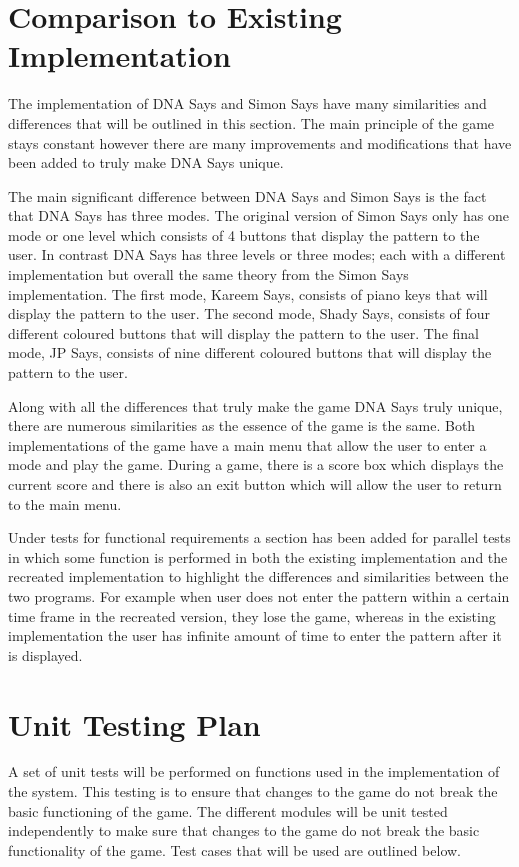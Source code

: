 \documentclass[12pt, titlepage]{article}
\begin{document}
\section{Comparison to Existing Implementation}	
\par The implementation of DNA Says and Simon Says have many similarities and differences that will be outlined in this section. The main principle of the game stays constant however there are many improvements and modifications that have been added to truly make DNA Says unique. 
\\
\par The main significant difference between DNA Says and Simon Says is the fact that DNA Says has three modes. The original version of Simon Says only has one mode or one level which consists of 4 buttons that display the pattern to the user. In contrast DNA Says has three levels or three modes; each with a different implementation but overall the same theory from the Simon Says implementation. The first mode, Kareem Says, consists of piano keys that will display the pattern to the user. The second mode, Shady Says, consists of four different coloured buttons that will display the pattern to the user. The final mode, JP Says, consists of nine different coloured buttons that will display the pattern to the user. 
\\
\par Along with all the differences that truly make the game DNA Says truly unique, there are numerous similarities as the essence of the game is the same. Both implementations of the game have a main menu that allow the user to enter a mode and play the game. During a game, there is a score box which displays the current score and there is also an exit button which will allow the user to return to the main menu.  
\\
\par Under tests for functional requirements a section has been added for parallel tests in which some function is performed in both the existing implementation and the recreated implementation to highlight the differences and similarities between the two programs. For example when user does not enter the pattern within a certain time frame in the recreated version, they lose the game, whereas in the existing implementation the user has infinite amount of time to enter the pattern after it is displayed.

				
\section{Unit Testing Plan}
A set of unit tests will be performed on functions used in the implementation of the system. This testing is to ensure that changes to the game do not break the basic functioning of the game. The different modules will be unit tested independently to make sure that changes to the game do not break the basic functionality of the game. Test cases that will be used are outlined below.
\end{document}
